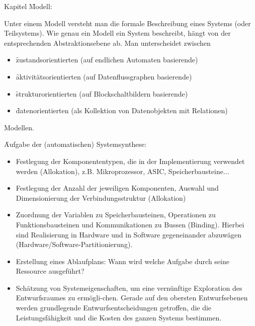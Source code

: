 \begin{chapter}{Kapitel}
\f{Modell}:
\vspace*{3pt}

\noindent Unter einem Modell versteht man die formale Beschreibung eines Systems (oder Teilsystems). Wie genau ein Modell ein System beschreibt, hängt von der 
entsprechenden Abstraktionsebene ab. Man unterscheidet \idr zwischen 
\begin{itemize}
 \item \f{zustandsorientierten} (\zb auf endlichen Automaten basierende)
 \item \f{aktivitätsorientierten} (\zb auf Datenflussgraphen basierende)
 \item \f{strukturorientierten} (\zb auf Blockschaltbildern basierende)
 \item \f{datenorientierten} (\zb als Kollektion von Datenobjekten mit Relationen)
\end{itemize}
Modellen.
\vspace*{5pt}

\f{Aufgabe der (automatischen) Systemsynthese}:
\begin{itemize}
 \item Festlegung der Komponententypen, die in der Implementierung verwendet werden (Allokation), z.B. Mikroprozessor, ASIC, Speicherbausteine...
 \item Festlegung der Anzahl der jeweiligen Komponenten, Auswahl und Dimensionierung der Verbindungsstruktur (Allokation)
 \item Zuordnung der Variablen zu Speicherbausteinen, Operationen zu Funktionsbausteinen und Kommunikationen zu Bussen (Binding). Hierbei sind Realisierung in 
 Hardware und in Software gegeneinander abzuwägen (Hardware/Software-Partitionierung).
 \item Erstellung eines Ablaufplans: Wann wird welche Aufgabe durch seine Ressource ausgeführt?
 \item Schätzung von Systemeigenschaften, um eine vernünftige Exploration des Entwurfsraumes zu ermögli-chen. Gerade auf den obersten Entwurfsebenen werden 
 grundlegende Entwurfsentscheidungen getroffen, die die Leistungsfähigkeit und die Kosten des ganzen Systems bestimmen.
\end{itemize}


\end{chapter}
